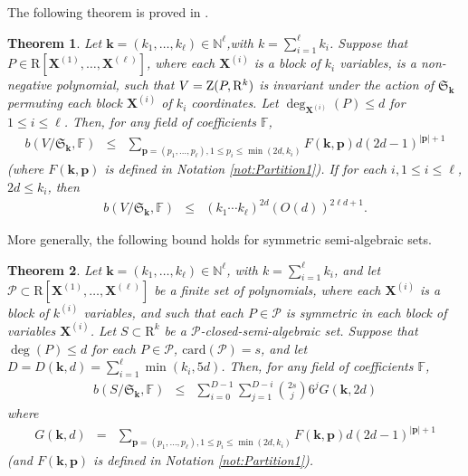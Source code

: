 \documentclass{amsart}
\newtheorem{theorem}{Theorem}
\theoremstyle{definition}
\theoremstyle{remark}
\numberwithin{equation}{section}
\begin{document}
The following theorem is proved in \cite{BC2013}.

\begin{theorem} \cite{BC2013}
  \label{thm:main} Let $\mathbf{k}= (k_{1} , \ldots ,k_{\ell}) \in
  {\mathbb{N}}^{\ell}$,with  $k= \sum_{i=1}^{\ell} k_{i}$. Suppose that 
  $P \in {\mathrm{R}} [{\mathbf{X}}^{(1)} , \ldots,{\mathbf{X}}^{(\ell)} ]$, where each
  ${\mathbf{X}}^{(i)}$ is a block of $k_{i}$ variables, is a 
  non-negative polynomial, such that $V= {{\rm Z}}(P, {\mathrm{R}}^{k})$ is
  invariant under the action of $\mathfrak{S}_{\mathbf{k}}$ permuting each
  block ${\mathbf{X}}^{(i)}$ of $k_{i}$ coordinates. Let
  $\deg_{{\mathbf{X}}^{(i)}} (P)   \leq  d$ for $1 \leq i \leq \ell$. Then, for any
  field of coefficients ${\mathbb{F}}$,
  \begin{eqnarray*}
    b (V/\mathfrak{S}_{\mathbf{k}} ,{\mathbb{F}}) & \leq &
    \sum_{\mathbf{p}= (p_{1} , \ldots , p_{\ell}) ,1 \leq p_{i}
    \leq \min (2d,k_{i})  } F (\mathbf{k},\mathbf{p})  d (2d-1)^{|
    \mathbf{p} | +1}
  \end{eqnarray*}
  (where $F(\mathbf{k},\mathbf{p})$ is defined in Notation \ref{not:Partition1}).
  If for each $i,1 \leq i \leq \ell$, $2d  \leq k_{i}$, then
  \begin{eqnarray*}
    b (V/\mathfrak{S}_{\mathbf{k}} ,{\mathbb{F}}) & \leq & (k_{1}
    \cdots k_{\ell})^{2d} (O (d))^{2 \ell d+1} .
  \end{eqnarray*}
\end{theorem}

More generally, the following bound holds for symmetric semi-algebraic sets.

\begin{theorem}\cite{BC2013}
  \label{thm:main-sa-closed}
  Let $\mathbf{k}= (k_{1} , \ldots ,k_{\ell})
  \in {\mathbb{N}}^{\ell}$, with $k= \sum_{i=1}^{\ell} k_{i}$, and let
  $\mathcal{P} \subset {\mathrm{R}} [ {\mathbf{X}}^{(1)} , \ldots,{\mathbf{X}}^{(\ell)} ]$ be a finite set of polynomials,
  where each ${\mathbf{X}}^{(i)}$ is a block of $k^{(i)}$
  variables, and such that each $P \in \mathcal{P}$ is symmetric in each block
  of variables ${\mathbf{X}}^{(i)}$. Let $S \subset {\mathrm{R}}^{k}$
  be a $\mathcal{P}$-closed-semi-algebraic set. Suppose that $\deg (P)  
  \leq  d$ for each $P  \in  \mathcal{P}$, ${\mathrm{card}} (
  \mathcal{P}) =s$, and let $D=D (\mathbf{k},d) = \sum_{i=1}^{\ell} \min
  (k_{i} ,5d)$. Then, for any field of coefficients ${\mathbb{F}}$,
  \begin{eqnarray*}
    b (S/\mathfrak{S}_{\mathbf{k}} ,{\mathbb{F}}) & \leq & \sum_{i=0}^{D-1}
    \sum_{j=1}^{D-i} \binom{2 s}{j} 6^{j} G (\mathbf{k},2d)
  \end{eqnarray*}
  where 
    \begin{eqnarray*}
    G (\mathbf{k},d) & = & \sum_{\mathbf{p}= (p_{1} , \ldots ,
    p_{\ell}) ,1 \leq p_{i} \leq \min (2d,k_{i})} F (
    \mathbf{k},\mathbf{p})  d (2d-1)^{| \mathbf{p} | +1}
  \end{eqnarray*}
  (and $F(\mathbf{k},\mathbf{p})$ is defined in Notation \ref{not:Partition1}).
\end{theorem}
\end{document}
